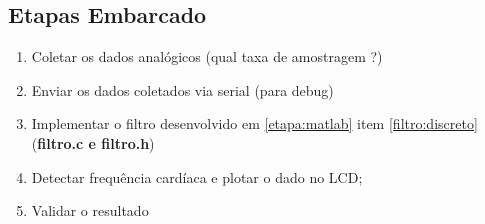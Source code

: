 \documentclass[11pt,a4paper]{scrartcl}
\begin{document}
%
%	

\subsection{Etapas Embarcado}

\begin{enumerate}
	\item Coletar os dados analógicos (qual taxa de amostragem ?)
	\item Enviar os dados coletados via serial (para debug)
	\item Implementar o filtro desenvolvido em \ref{etapa:matlab} item \ref{filtro:discreto} (\textbf{filtro.c e filtro.h})
	\item Detectar frequência cardíaca e plotar o dado no LCD;
	\item Validar o resultado
\end{enumerate}
\end{document}
